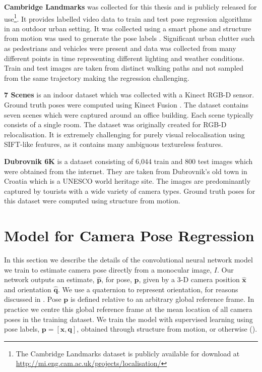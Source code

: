 \textbf{Cambridge Landmarks} \citep{kendall2015posenet} was collected for this thesis and is publicly released for use\footnote{The Cambridge Landmarks dataset is publicly available for download at \footnotesize{\url{http://mi.eng.cam.ac.uk/projects/localisation/}}}. It provides labelled video data to train and test pose regression algorithms in an outdoor urban setting. It was collected using a smart phone and structure from motion was used to generate the pose labels \citep{wu2013towards}. Significant urban clutter such as pedestrians and vehicles were present and data was collected from many different points in time representing different lighting and weather conditions. Train and test images are taken from distinct walking paths and not sampled from the same trajectory making the regression challenging.

\textbf{7 Scenes} \citep{shotton2013scene} is an indoor dataset which was collected with a Kinect RGB-D sensor. Ground truth poses were computed using Kinect Fusion \citep{shotton2013scene}. The dataset contains seven scenes which were captured around an office building. Each scene typically consists of a single room. The dataset was originally created for RGB-D relocalisation. It is extremely challenging for purely visual relocalisation using SIFT-like features, as it contains many ambiguous textureless features.

\textbf{Dubrovnik 6K} \citep{li2012worldwide} is a dataset consisting of 6,044 train and 800 test images which were obtained from the internet. They are taken from Dubrovnik's old town in Croatia which is a UNESCO world heritage site. The images are predominantly captured by tourists with a wide variety of camera types. Ground truth poses for this dataset were computed using structure from motion.

\section{Model for Camera Pose Regression}
\label{sec:model}

In this section we describe the details of the convolutional neural network model we train to estimate camera pose directly from a monocular image, $I$. Our network outputs an estimate, $\mathbf{\hat{p}}$, for pose, $\mathbf{p}$, given by a 3-D camera position $\mathbf{\hat{x}}$ and orientation $\mathbf{\hat{q}}$. We use a quaternion to represent orientation, for reasons discussed in . Pose $\mathbf{p}$ is defined relative to an arbitrary global reference frame. In practice we centre this global reference frame at the mean location of all camera poses in the training dataset. We train the model with supervised learning using pose labels, $\mathbf{p} = [\mathbf{x}, \mathbf{q}]$, obtained through structure from motion, or otherwise (). 

